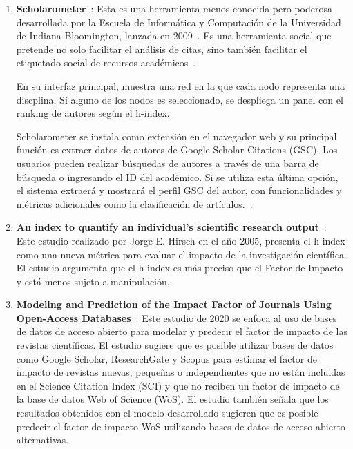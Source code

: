 \begin{enumerate} 

  \item \textbf{Scholarometer}~\cite{scholarometer2018}:  Esta es una herramienta menos conocida pero poderosa desarrollada por la Escuela de Informática y Computación de la Universidad de Indiana-Bloomington, lanzada en 2009~\cite{kaur2012}. Es una herramienta social que pretende no solo facilitar el análisis de citas, sino también facilitar el etiquetado social de recursos académicos~\cite{lopez2017}.

  En su interfaz principal, muestra una red en la que cada nodo representa una discplina. Si alguno de los nodos es seleccionado, se despliega un panel con el ranking de autores según el h-index.

  
  Scholarometer se instala como extensión en el navegador web y su principal función es extraer datos de autores de Google Scholar Citations (GSC). Los usuarios pueden realizar búsquedas de autores a través de una barra de búsqueda o ingresando el ID del académico. Si se utiliza esta última opción, el sistema extraerá y mostrará el perfil GSC del autor, con funcionalidades y métricas adicionales como la clasificación de artículos.~\cite{lopez2017}.
  

  \item \textbf{An index to quantify an individual's scientific research output}~\cite{hirsch2005}:  Este estudio realizado por Jorge E. Hirsch en el año 2005, presenta el h-index como una nueva métrica para evaluar el impacto de la investigación científica. El estudio argumenta que el h-index es más preciso que el Factor de Impacto y está menos sujeto a manipulación.


  \item \textbf{Modeling and Prediction of the Impact Factor of Journals Using Open-Access Databases}~\cite{templ2020}: Este estudio de 2020 se enfoca al uso de bases de datos de acceso abierto para modelar y predecir el factor de impacto de las revistas científicas. El estudio sugiere que es posible utilizar bases de datos como Google Scholar, ResearchGate y Scopus para estimar el factor de impacto de revistas nuevas, pequeñas o independientes que no están incluidas en el Science Citation Index (SCI) y que no reciben un factor de impacto de la base de datos Web of Science (WoS). El estudio también señala que los resultados obtenidos con el modelo desarrollado sugieren que es posible predecir el factor de impacto WoS utilizando bases de datos de acceso abierto alternativas.
  
\end{enumerate}

